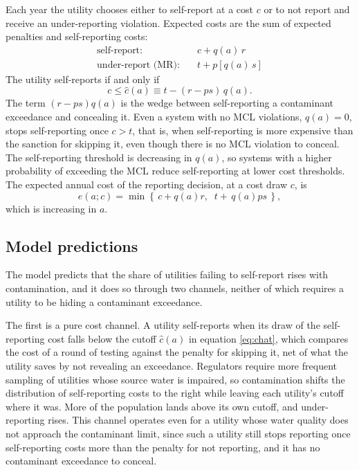 \documentclass[12pt]{article}
\begin{document}
	Each year the utility chooses either to self-report at a cost $c$ or to not report and receive an under-reporting violation. Expected costs are the sum of expected penalties and self-reporting costs:
	\begin{align*}
		\text{self-report:} \quad & c + q(a)\,r \\
		\text{under-report (MR):} \quad & t + p\left[q(a)\,s\right]
	\end{align*}
	The utility self-reports if and only if
	\begin{equation}\label{eq:chat}
		c \le \hat{c}(a) \equiv t - (r - ps)\,q(a).
	\end{equation}
	The term $(r - ps)q(a)$ is the wedge between self-reporting a contaminant exceedance and concealing it. Even a system with no MCL violations, $q(a) = 0$, stops self-reporting once $c > t$, that is, when self-reporting is more expensive than the sanction for skipping it, even though there is no MCL violation to conceal. The self-reporting threshold is decreasing in $q(a)$, so systems with a higher probability of exceeding the MCL reduce self-reporting at lower cost thresholds. The expected annual cost of the reporting decision, at a cost draw $c$, is
	\begin{equation}\label{eq:endog_penalty}
		e(a;c) = \min\left\{\, c + q(a)r,\;\; t + \,q(a)ps \,\right\},
	\end{equation}
	which is increasing in $a$.
	
	\subsection{Model predictions}

	The model predicts that the share of utilities failing to self-report rises with contamination, and it does so through two channels, neither of which requires a utility to be hiding a contaminant exceedance.

	The first is a pure cost channel. A utility self-reports when its draw of the self-reporting cost falls below the cutoff $\hat{c}(a)$ in equation \eqref{eq:chat}, which compares the cost of a round of testing against the penalty for skipping it, net of what the utility saves by not revealing an exceedance. Regulators require more frequent sampling of utilities whose source water is impaired, so contamination shifts the distribution of self-reporting costs to the right while leaving each utility's cutoff where it was. More of the population lands above its own cutoff, and under-reporting rises. This channel operates even for a utility whose water quality does not approach the contaminant limit, since such a utility still stops reporting once self-reporting costs more than the penalty for not reporting, and it has no contaminant exceedance to conceal.
\end{document}
